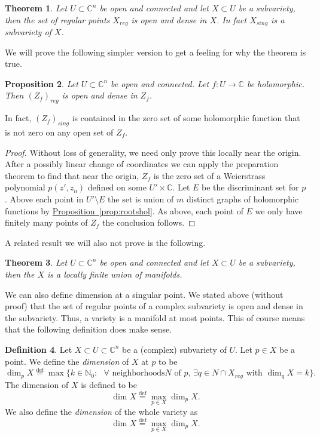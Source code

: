 \documentclass[12pt,openany]{book}
\newcommand{\C}{{\mathbb{C}}}
\newcommand{\N}{{\mathbb{N}}}
\newcommand{\myindex}[1]{#1\index{#1}}
\theoremstyle{plain}
\newtheorem{thm}{Theorem}[section]
\newtheorem{prop}[thm]{Proposition}
\theoremstyle{remark}
\theoremstyle{definition}
\newtheorem{defn}[thm]{Definition}
\theoremstyle{exercise}
\theoremstyle{example}
\newcommand{\propref}[1]{\hyperref[#1]{Proposition~\ref*{#1}}}
\begin{document}
\begin{thm}
Let $U \subset \C^n$ be open and connected and let $X \subset U$
be a subvariety, then the set of regular points $X_{\mathit{reg}}$
is open and dense in $X$.
In fact $X_{\mathit{sing}}$ is a subvariety of $X$.
\end{thm}

We will prove the following simpler version to get a feeling for why the
theorem is true.

\begin{prop}
Let $U \subset \C^n$ be open and connected.
Let $f \colon U \to \C$ be holomorphic.
Then $(Z_f)_{\mathit{reg}}$ is open and dense in $Z_f$.
\end{prop}

In fact,
$(Z_f)_{\mathit{sing}}$ is contained in the zero set of some holomorphic
function that is not zero on any open set of $Z_f$.

\begin{proof}
Without loss of generality,
we need only prove this locally near the origin.  After a possibly
linear change of coordinates we can apply the preparation theorem to find
that near the origin, $Z_f$ is the zero set of a Weierstrass polynomial
$p(z',z_n)$ defined on some $U' \times \C$.
Let $E$ be the discriminant set for $p$.  Above each
point in $U' \setminus E$ the set is union of $m$ distinct graphs
of holomorphic functions by \propref{prop:rootshol}.  As above,
each point of $E$ we only have finitely many points of $Z_f$ the conclusion
follows.
\end{proof}

A related result we will also not prove is the following.

\begin{thm}
Let $U \subset \C^n$ be open and connected and let $X \subset U$
be a subvariety, then the $X$ is a locally finite union of manifolds.
\end{thm}

We can also define dimension at a singular point.
We stated above (without proof) that the set of regular points of a complex
subvariety is open and dense in the subvariety.  Thus, a
variety is a manifold at most points.  This of course means that the 
following definition does make sense.

\begin{defn}
Let $X \subset U \subset \C^n$ be a (complex) subvariety of $U$.  Let $p \in
X$ be a point.  We define the \emph{\myindex{dimension}} of $X$ at $p$
to be
\begin{equation}
\dim_p X \overset{\text{def}}{=}
\max \{ k \in \N_0 : \text{ $\forall$ neighborhoods
$N$ of $p$, $\exists q \in N \cap X_{\mathit{reg}}$ with $\dim_q X = k$} \} .
\end{equation}
The dimension of $X$ is defined to be
\begin{equation}
\dim X \overset{\text{def}}{=}
\max_{p \in X} \dim_p X .
\end{equation}
We also define the \emph{dimension} of the whole variety as
\begin{equation}
\dim X \overset{\text{def}}{=}
\max_{p \in X} \dim_p X.
\end{equation}
\end{defn}
\end{document}
